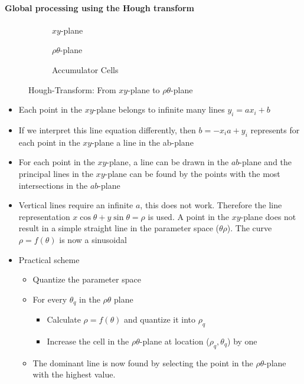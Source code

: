\paragraph{Global processing using the Hough transform}
\begin{figure}[h]
	\centering
	\begin{subfigure}{0.3\textwidth}
		
		\caption{$xy$-plane}
	\end{subfigure}
	\begin{subfigure}{0.3\textwidth}
		
		\caption{$\rho\theta$-plane}
	\end{subfigure}
	\begin{subfigure}{0.3\textwidth}
		
		\caption{Accumulator Cells}
	\end{subfigure}
	\caption{Hough-Transform: From $xy$-plane to $\rho\theta$-plane}
\end{figure}
\begin{itemize}
\item Each point in the $xy$-plane belongs to infinite many lines $y_i=ax_i+b$
\item If we interpret this line equation differently, then $b=-x_ia+y_i$ represents for each point in the $xy$-plane a line in the ab-plane
\item For each point in the $xy$-plane, a line can be drawn in the $ab$-plane and the principal lines in the $xy$-plane can be found by the points with the most intersections in the $ab$-plane
\item Vertical lines require an infinite $a$, this does not work. Therefore the line representation $x \cos \theta + y \sin \theta = \rho$ is used. A point in the $xy$-plane does not result in a simple straight line in the parameter space ($\theta\rho$). The curve $\rho = f(\theta)$ is now a sinusoidal
\item Practical scheme
\begin{itemize}
\item Quantize the parameter space
\item For every $\theta_q$ in the $\rho\theta$ plane
	\begin{itemize}
		\item Calculate $\rho = f(\theta)$ and quantize it into $\rho_q$
		\item Increase the cell in the $\rho\theta$-plane at location ($\rho_q, \theta_q$) by one
	\end{itemize}
\item The dominant line is now found by selecting the point in the $\rho\theta$-plane with the highest value.
\end{itemize}
\end{itemize}

